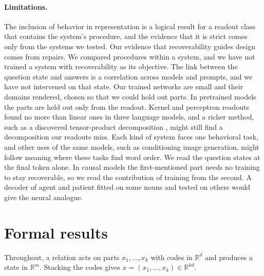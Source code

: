 \documentclass[10pt]{article}
\theoremstyle{plain}
\theoremstyle{remark}
\newcommand{\R}{\mathbb{R}}
\begin{document}
\paragraph{Limitations.} The inclusion of behavior in representation is a logical result for a readout class that contains the system's procedure, and the evidence that it is strict comes only from the systems we tested. Our evidence that recoverability guides design comes from repairs. We compared procedures within a system, and we have not trained a system with recoverability as its objective. The link between the question state and answers is a correlation across models and prompts, and we have not intervened on that state. Our trained networks are small and their domains rendered, chosen so that we could hold out parts. In pretrained models the parts are held out only from the readout. Kernel and perceptron readouts found no more than linear ones in three language models, and a richer method, such as a discovered tensor-product decomposition \citep{soulos2020}, might still find a decomposition our readouts miss. Each kind of system faces one behavioral task, and other uses of the same models, such as conditioning image generation, might follow meaning where these tasks find word order. We read the question states at the final token alone. In causal models the first-mentioned part needs no training to stay recoverable, so we read the contribution of training from the second. A decoder of agent and patient \citep{frankland2015} fitted on some nouns and tested on others would give the neural analogue.

\FloatBarrier



\clearpage
\appendix
\makeatletter\let\@fb@secFB\relax\makeatother %

\section{Formal results}
\label{app:proofs}

Throughout, a relation acts on parts $x_1, \ldots, x_k$ with codes in $\R^d$ and produces a state in $\R^m$. Stacking the codes gives $x = (x_1, \ldots, x_k) \in \R^{kd}$.
\end{document}
